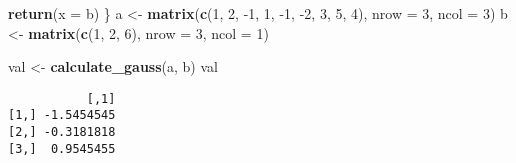 \documentclass[]{article}
\newenvironment{Shaded}{\begin{snugshade}}{\end{snugshade}}
\newcommand{\DataTypeTok}[1]{\textcolor[rgb]{0.13,0.29,0.53}{#1}}
\newcommand{\DecValTok}[1]{\textcolor[rgb]{0.00,0.00,0.81}{#1}}
\newcommand{\KeywordTok}[1]{\textcolor[rgb]{0.13,0.29,0.53}{\textbf{#1}}}
\newcommand{\NormalTok}[1]{#1}
\newcommand{\StringTok}[1]{\textcolor[rgb]{0.31,0.60,0.02}{#1}}
\begin{document}
\begin{Shaded}
\begin{Highlighting}[]
    \KeywordTok{return}\NormalTok{(}\DataTypeTok{x =}\NormalTok{ b)}
\NormalTok{\}}
\NormalTok{a <-}\StringTok{ }\KeywordTok{matrix}\NormalTok{(}\KeywordTok{c}\NormalTok{(}\DecValTok{1}\NormalTok{, }\DecValTok{2}\NormalTok{, }\DecValTok{-1}\NormalTok{, }\DecValTok{1}\NormalTok{, }\DecValTok{-1}\NormalTok{, }\DecValTok{-2}\NormalTok{, }\DecValTok{3}\NormalTok{, }\DecValTok{5}\NormalTok{, }\DecValTok{4}\NormalTok{), }\DataTypeTok{nrow =} \DecValTok{3}\NormalTok{, }\DataTypeTok{ncol =} \DecValTok{3}\NormalTok{)}
\NormalTok{b <-}\StringTok{ }\KeywordTok{matrix}\NormalTok{(}\KeywordTok{c}\NormalTok{(}\DecValTok{1}\NormalTok{, }\DecValTok{2}\NormalTok{, }\DecValTok{6}\NormalTok{), }\DataTypeTok{nrow =} \DecValTok{3}\NormalTok{, }\DataTypeTok{ncol =} \DecValTok{1}\NormalTok{)}

\NormalTok{val <-}\StringTok{ }\KeywordTok{calculate_gauss}\NormalTok{(a, b)}
\NormalTok{val}
\end{Highlighting}
\end{Shaded}

\begin{verbatim}
           [,1]
[1,] -1.5454545
[2,] -0.3181818
[3,]  0.9545455
\end{verbatim}
\end{document}
